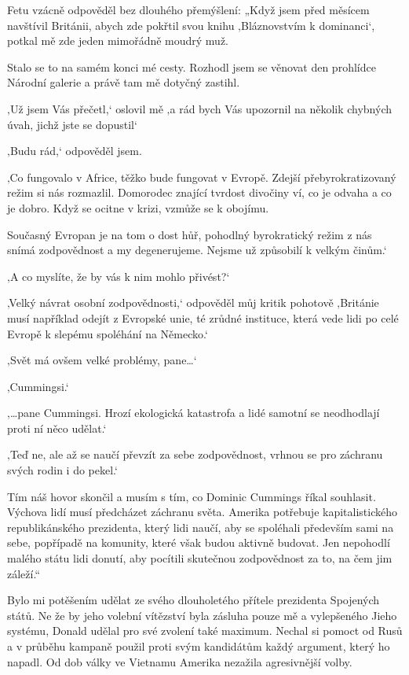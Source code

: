 Fetu vzácně odpověděl bez dlouhého přemýšlení: „Když jsem před měsícem navštívil Británii, abych zde pokřtil svou knihu ‚Bláznovstvím k dominanci‘, potkal mě zde jeden mimořádně moudrý muž.

Stalo se to na samém konci mé cesty. Rozhodl jsem se věnovat den prohlídce Národní galerie a právě tam mě dotyčný zastihl.

‚Už jsem Vás přečetl,‘ oslovil mě ‚a rád bych Vás upozornil na několik chybných úvah, jichž jste se dopustil‘

‚Budu rád,‘ odpověděl jsem.

‚Co fungovalo v Africe, těžko bude fungovat v Evropě. Zdejší přebyrokratizovaný režim si nás rozmazlil. Domorodec znající tvrdost divočiny ví, co je odvaha a co je dobro. Když se ocitne v krizi, vzmůže se k obojímu.

Současný Evropan je na tom o dost hůř, pohodlný byrokratický režim z nás snímá zodpovědnost a my degenerujeme. Nejsme už způsobilí k velkým činům.‘

‚A co myslíte, že by vás k nim mohlo přivést?‘

‚Velký návrat osobní zodpovědnosti,‘ odpověděl můj kritik pohotově ‚Británie musí například odejít z Evropské unie, té zrůdné instituce, která vede lidi po celé Evropě k slepému spoléhání na Německo.‘

‚Svět má ovšem velké problémy, pane…‘

‚Cummingsi.‘

‚…pane Cummingsi. Hrozí ekologická katastrofa a lidé samotní se neodhodlají proti ní něco udělat.‘

‚Teď ne, ale až se naučí převzít za sebe zodpovědnost, vrhnou se pro záchranu svých rodin i do pekel.‘

Tím náš hovor skončil a musím s tím, co Dominic Cummings říkal souhlasit. Výchova lidí musí předcházet záchranu světa. Amerika potřebuje kapitalistického republikánského prezidenta, který lidi naučí, aby se spoléhali především sami na sebe, popřípadě na komunity, které však budou aktivně budovat. Jen nepohodlí malého státu lidi donutí, aby pocítili skutečnou zodpovědnost za to, na čem jim záleží.“

Bylo mi potěšením udělat ze svého dlouholetého přítele prezidenta Spojených států. Ne že by jeho volební vítězství byla zásluha pouze mě a vylepšeného Jieho systému, Donald udělal pro své zvolení také maximum. Nechal si pomoct od Rusů a v průběhu kampaně použil proti svým kandidátům každý argument, který ho napadl. Od dob války ve Vietnamu Amerika nezažila agresivnější volby.

